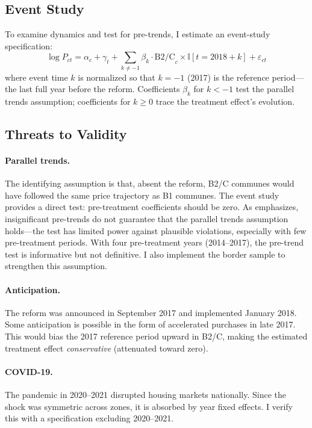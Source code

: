 \documentclass[12pt]{article}
\newcommand{\ind}{\mathbb{I}}
\begin{document}
\subsection{Event Study}

To examine dynamics and test for pre-trends, I estimate an event-study specification:
\begin{equation}\label{eq:es}
\log P_{ct} = \alpha_c + \gamma_t + \sum_{k \neq -1} \beta_k \cdot \text{B2/C}_c \times \ind[t = 2018 + k] + \varepsilon_{ct}
\end{equation}
where event time $k$ is normalized so that $k = -1$ (2017) is the reference period---the last full year before the reform. Coefficients $\beta_k$ for $k < -1$ test the parallel trends assumption; coefficients for $k \geq 0$ trace the treatment effect's evolution.

\subsection{Threats to Validity}

\paragraph{Parallel trends.} The identifying assumption is that, absent the reform, B2/C communes would have followed the same price trajectory as B1 communes. The event study provides a direct test: pre-treatment coefficients should be zero. As \citet{roth2023} emphasizes, insignificant pre-trends do not guarantee that the parallel trends assumption holds---the test has limited power against plausible violations, especially with few pre-treatment periods. With four pre-treatment years (2014--2017), the pre-trend test is informative but not definitive. I also implement the border sample to strengthen this assumption.

\paragraph{Anticipation.} The reform was announced in September 2017 and implemented January 2018. Some anticipation is possible in the form of accelerated purchases in late 2017. This would bias the 2017 reference period upward in B2/C, making the estimated treatment effect \textit{conservative} (attenuated toward zero).

\paragraph{COVID-19.} The pandemic in 2020--2021 disrupted housing markets nationally. Since the shock was symmetric across zones, it is absorbed by year fixed effects. I verify this with a specification excluding 2020--2021.
\end{document}

